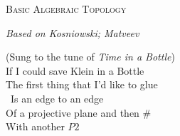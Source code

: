 \documentclass[nocover]{pset}
\begin{document}
\begin{center}
  {\scshape \Large Basic Algebraic Topology}

  {\itshape Based on Kosniowski; Matveev}
\end{center}
\vspace{-.1cm}
\hrulefill

\begin{center}
  \begin{minipage}[H]{.4\linewidth}
  (Sung to the tune of \emph{Time in a Bottle}) \\
  If I could save Klein in a Bottle \\
  The first thing that I'd like to glue\\\
  Is an edge to an edge\\
  Of a projective plane and then $\#$ \\
  With another $P2$
  \end{minipage}
\end{center}
\end{document}
